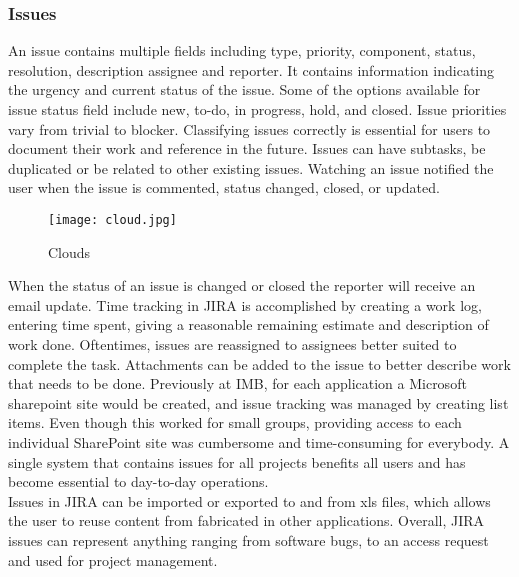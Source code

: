   \subsubsection{Issues}
  An \gls{issue} contains multiple fields including type, priority, component, status, resolution, description assignee and reporter. It contains information indicating the urgency and current status of the issue. Some of the options available for issue status field include new, to-do, in progress, hold, and closed. Issue priorities vary from trivial to blocker. Classifying issues correctly is essential for users to document their work and reference in the future. Issues can have subtasks, be duplicated or be related to other existing issues. Watching an issue notified the user when the issue is commented, status changed, closed, or updated.
  \begin{figure}[H]
  	\texttt{[image: cloud.jpg]}
  	\caption{Clouds}
  \end{figure}
 \noindent When the status of an issue is changed or closed the reporter will receive an email update. Time tracking in \gls{JIRA} is accomplished by creating a work log, entering time spent, giving a reasonable remaining estimate and description of work done. Oftentimes, issues are reassigned to assignees better suited to complete the task. Attachments can be added to the issue to better describe work that needs to be done. Previously at IMB, for each application a Microsoft \gls{sharepoint} site would be created, and issue tracking was managed by creating list items. Even though this worked for small groups, providing access to each individual SharePoint site was cumbersome and time-consuming for everybody. A single system that contains issues for all projects benefits all users and has become essential to day-to-day operations. \\ 
 
 \noindent Issues in JIRA can be imported or exported to and from xls files, which allows the user to reuse content from fabricated in other applications. Overall, JIRA issues can represent anything ranging from software bugs, to an access request and used for project management.
 
